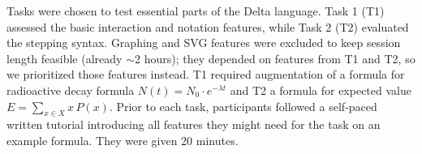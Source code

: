 Tasks were chosen to test essential parts of the Delta language. Task 1 (T1) assessed the basic interaction and notation features, while Task 2 (T2) evaluated the stepping syntax. Graphing and SVG features were excluded to keep session length feasible (already ${\sim}$2 hours); they depended on features from T1 and T2, so we prioritized those features instead.
T1 required augmentation of a formula for radioactive decay formula $N(t) = N_0 \cdot e^{-\lambda t}$ and T2 a formula for expected value $E = \sum_{x \in X} x\, P(x)$. Prior to each task, participants followed a self-paced written tutorial introducing all features they might need for the task on an example formula. They were given 20 minutes.





